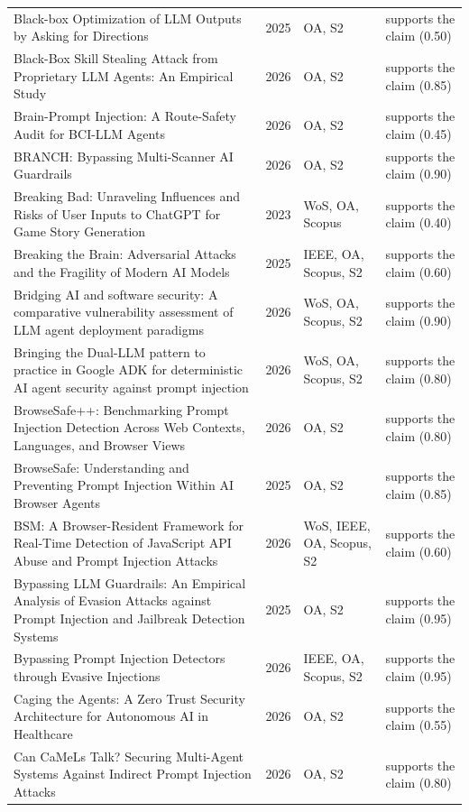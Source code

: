 \begin{longtable}{@{}%
  >{\raggedright\arraybackslash}p{}c%
  >{\raggedright\arraybackslash}p{}%
  >{\raggedright\arraybackslash}p{}@{}}
Black-box Optimization of LLM Outputs by Asking for Directions & 2025 & OA, S2 & supports the claim (0.50) \\
Black-Box Skill Stealing Attack from Proprietary LLM Agents: An Empirical Study & 2026 & OA, S2 & supports the claim (0.85) \\
Brain-Prompt Injection: A Route-Safety Audit for BCI-LLM Agents & 2026 & OA, S2 & supports the claim (0.45) \\
BRANCH: Bypassing Multi-Scanner AI Guardrails & 2026 & OA, S2 & supports the claim (0.90) \\
Breaking Bad: Unraveling Influences and Risks of User Inputs to ChatGPT for Game Story Generation & 2023 & WoS, OA, Scopus & supports the claim (0.40) \\
Breaking the Brain: Adversarial Attacks and the Fragility of Modern AI Models & 2025 & IEEE, OA, Scopus, S2 & supports the claim (0.60) \\
Bridging AI and software security: A comparative vulnerability assessment of LLM agent deployment paradigms & 2026 & WoS, OA, Scopus, S2 & supports the claim (0.90) \\
Bringing the Dual-LLM pattern to practice in Google ADK for deterministic AI agent security against prompt injection & 2026 & WoS, OA, Scopus, S2 & supports the claim (0.80) \\
BrowseSafe++: Benchmarking Prompt Injection Detection Across Web Contexts, Languages, and Browser Views & 2026 & OA, S2 & supports the claim (0.80) \\
BrowseSafe: Understanding and Preventing Prompt Injection Within AI Browser Agents & 2025 & OA, S2 & supports the claim (0.85) \\
BSM: A Browser-Resident Framework for Real-Time Detection of JavaScript API Abuse and Prompt Injection Attacks & 2026 & WoS, IEEE, OA, Scopus, S2 & supports the claim (0.60) \\
Bypassing LLM Guardrails: An Empirical Analysis of Evasion Attacks against Prompt Injection and Jailbreak Detection Systems & 2025 & OA, S2 & supports the claim (0.95) \\
Bypassing Prompt Injection Detectors through Evasive Injections & 2026 & IEEE, OA, Scopus, S2 & supports the claim (0.95) \\
Caging the Agents: A Zero Trust Security Architecture for Autonomous AI in Healthcare & 2026 & OA, S2 & supports the claim (0.55) \\
Can CaMeLs Talk? Securing Multi-Agent Systems Against Indirect Prompt Injection Attacks & 2026 & OA, S2 & supports the claim (0.80) \\

\end{longtable}
